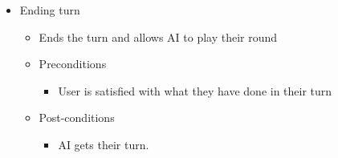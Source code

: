 \documentclass{article}
\begin{document}
	\begin{itemize}
   		\item  Ending turn
			\begin{itemize}
				\item Ends the turn and allows AI to play their round
				\item Preconditions
				\begin{itemize}
					\item User is satisfied with what they have done in their turn
				\end{itemize}
				\item Post-conditions
				\begin{itemize}
					\item AI gets their turn.
				\end{itemize}
			\end{itemize}
	\end{itemize}
	
\end{document}
